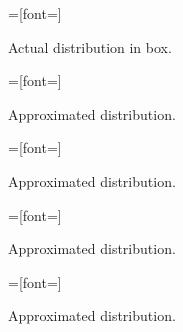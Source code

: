 
\setlength{}
\setlength{}

\begin{figure}[H]
{}=[font=\scriptsize]

\caption{Actual distribution in box.}
\label{fig:elong10}
\end{figure}

\begin{figure}[H]
{}=[font=\scriptsize]

\caption{Approximated distribution.}
\label{fig:elong30}
\end{figure}

\begin{figure}[H]
{}=[font=\scriptsize]

\caption{Approximated distribution.}
\label{fig:elong50}
\end{figure}

\begin{figure}[H]
{}=[font=\scriptsize]

\caption{Approximated distribution.}
\label{fig:elong100}
\end{figure}
\vfill

\setlength{}
\setlength{}

\begin{figure}[H]
{}=[font=\scriptsize]

\caption{Approximated distribution.}
\label{fig:accuracy}
\end{figure}